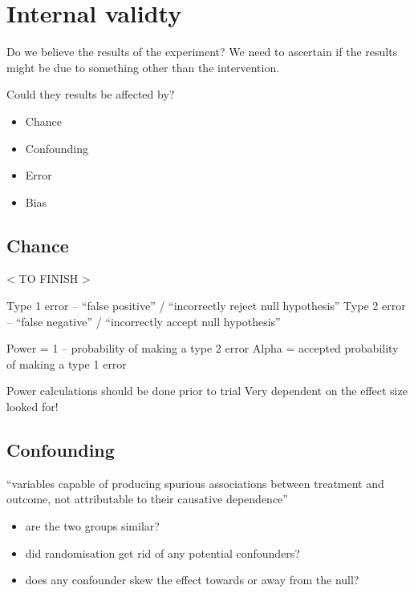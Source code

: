 \documentclass[
]{book}
\providecommand{\tightlist}{%
  \setlength{\itemsep}{0pt}\setlength{\parskip}{0pt}}
\theoremstyle{definition}
\theoremstyle{definition}
\theoremstyle{definition}
\theoremstyle{definition}
\theoremstyle{remark}
\begin{document}
\hypertarget{internal-validty}{%
\section{Internal validty}\label{internal-validty}}

Do we believe the results of the experiment? We need to ascertain if the results might be due to something other than the intervention.

Could they results be affected by?

\begin{itemize}
\tightlist
\item
  Chance
\item
  Confounding
\item
  Error
\item
  Bias
\end{itemize}

\hypertarget{chance}{%
\subsection{Chance}\label{chance}}

\textless{} TO FINISH \textgreater{}

Type 1 error -- ``false positive'' / ``incorrectly reject null hypothesis''
Type 2 error -- ``false negative'' / ``incorrectly accept null hypothesis''

Power = 1 -- probability of making a type 2 error
Alpha = accepted probability of making a type 1 error

Power calculations should be done prior to trial
Very dependent on the effect size looked for!

\hypertarget{confounding}{%
\subsection{Confounding}\label{confounding}}

``variables capable of producing spurious associations between treatment and outcome, not attributable to their causative dependence''

\begin{itemize}
\tightlist
\item
  are the two groups similar?
\item
  did randomisation get rid of any potential confounders?
\item
  does any confounder skew the effect towards or away from the null?
\end{itemize}
\end{document}
